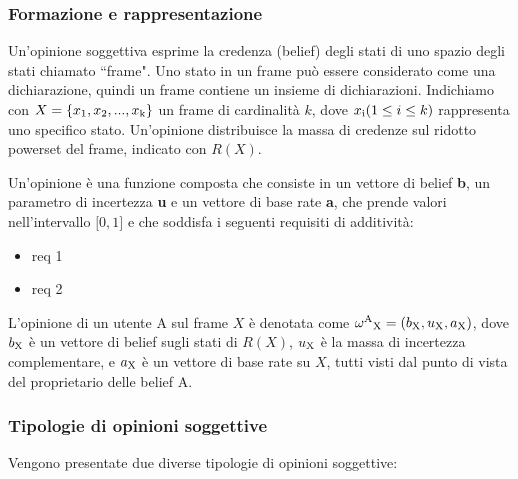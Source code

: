 \documentclass{report}
\begin{document}
	\hypertarget{header-n50}{%
		\subsubsection{Formazione e rappresentazione}\label{header-n50}}
	
	Un'opinione soggettiva esprime la credenza (belief) degli stati di uno
	spazio degli stati chiamato ``frame". Uno stato in un frame può essere
	considerato come una dichiarazione, quindi un frame contiene un insieme
	di dichiarazioni. Indichiamo con $X = \{x\textsubscript{1}, x\textsubscript{2}, ... , x\textsubscript{k}\}$ un frame di
	cardinalità $k$, dove $x\textsubscript{i} (1\le i \le k)$ rappresenta uno
	specifico stato. Un'opinione distribuisce la massa di credenze sul
	ridotto powerset del frame, indicato con $R(X)$.
	
	Un'opinione è una funzione composta che consiste in un vettore di belief
	\textbf{b}, un parametro di incertezza \textbf{u} e un vettore di base
	rate \textbf{a}, che prende valori nell'intervallo ${[}0,1{]}$ e che
	soddisfa i seguenti requisiti di additività:
	
	\begin{itemize}
		\item
		req 1
		\item
		req 2
	\end{itemize}
	
	L'opinione di un utente A sul frame $X$ è denotata come $\omega \textsuperscript{A}\textsubscript{X} =
	(b\textsubscript{X},u\textsubscript{X},a\textsubscript{X})$, dove $b\textsubscript{X}$ è un vettore di belief sugli stati di $R(X)$,
	$u\textsubscript{X}$ è la massa di incertezza complementare, e $a\textsubscript{X}$ è un vettore di base
	rate su $X$, tutti visti dal punto di vista del proprietario delle belief
	A.
	
	\hypertarget{header-n64}{%
		\subsubsection{Tipologie di opinioni soggettive}\label{header-n64}}
	
	Vengono presentate due diverse tipologie di opinioni soggettive:
	
\end{document}
